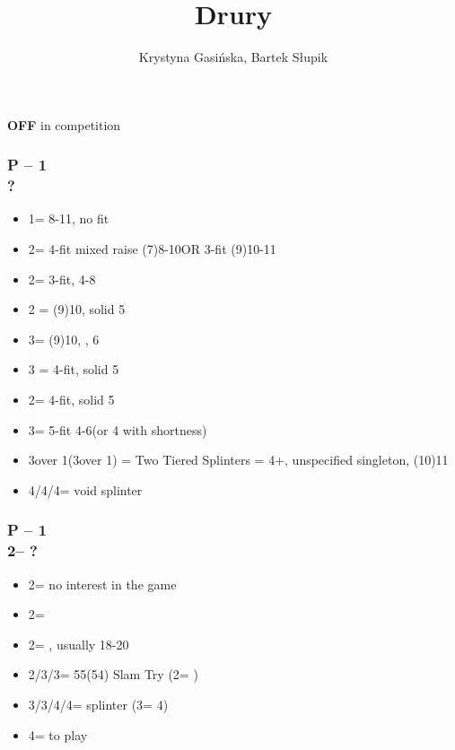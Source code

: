 \documentclass[12pt, a4paper]{article}
\title{Drury}
\author{Krystyna Gasińska, Bartek Słupik}
\begin{document}
\maketitle


{\textbf{OFF}} in competition

\subsubsection*{P -- 1\majs \\ ?}
\begin{itemize}
    \item 1\nt = 8-11, no fit
    \item 2\clubs = 4-fit mixed raise (7)8-10\dps OR 3-fit (9)10-11\dps
    \item 2\majs = 3-fit, 4-8\dps
    \item 2 = (9)10, solid 5
    \item 3\clubs = (9)10, \inv, 6\clubs
    \item 3 = 4-fit, solid 5
    \item 2\nt = 4-fit, solid 5\clubs
    \item 3\majs = 5-fit 4-6\dps (or 4 with shortness)
    \item 3\nt over 1\spades (3\spades over 1\hearts) = Two Tiered Splinters = 4+\majs, unspecified singleton, (10)11\dps
    \item 4\clubs/4\diams/4\hearts = void splinter
\end{itemize}

\subsubsection*{P -- 1\hearts \\ 2\clubs -- ?}
\begin{itemize}
    \item 2\hearts = no interest in the game
    \item 2\diams = \inv
    \item 2\spades = \lsf, usually 18-20 \bal
    \item 2\nt/3\clubs/3\diams = 55(54) Slam Try (2\nt = \spades)
    \item 3\nt/3\spades/4\clubs/4\diams = splinter (3\nt = 4\diams)
    \item 4\hearts = to play
\end{itemize}
\end{document}
